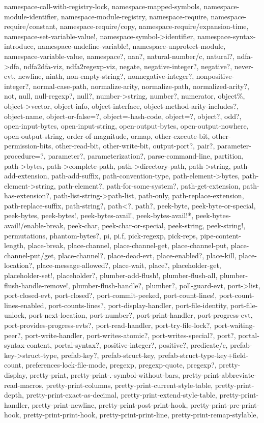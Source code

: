 {{namespace-call-with-registry-lock, namespace-mapped-symbols, namespace-module-identifier, namespace-module-registry, namespace-require, namespace-require/constant, namespace-require/copy, namespace-require/expansion-time, namespace-set-variable-value!, namespace-symbol->identifier, namespace-syntax-introduce, namespace-undefine-variable!, namespace-unprotect-module, namespace-variable-value, namespace?, nan?, natural-number/c, natural?, ndfa->dfa, ndfa2dfa-viz, ndfa2regexp-viz, negate, negative-integer?, negative?, never-evt, newline, ninth, non-empty-string?, nonnegative-integer?, nonpositive-integer?, normal-case-path, normalize-arity, normalize-path, normalized-arity?, not, null, null-regexp?, null?, number->string, number?, numerator, object\%, object->vector, object-info, object-interface, object-method-arity-includes?, object-name, object-or-false=?, object=-hash-code, object=?, object?, odd?, open-input-bytes, open-input-string, open-output-bytes, open-output-nowhere, open-output-string, order-of-magnitude, ormap, other-execute-bit, other-permission-bits, other-read-bit, other-write-bit, output-port?, pair?, parameter-procedure=?, parameter?, parameterization?, parse-command-line, partition, path->bytes, path->complete-path, path->directory-path, path->string, path-add-extension, path-add-suffix, path-convention-type, path-element->bytes, path-element->string, path-element?, path-for-some-system?, path-get-extension, path-has-extension?, path-list-string->path-list, path-only, path-replace-extension, path-replace-suffix, path-string?, path<?, path?, peek-byte, peek-byte-or-special, peek-bytes, peek-bytes!, peek-bytes-avail!, peek-bytes-avail!*, peek-bytes-avail!/enable-break, peek-char, peek-char-or-special, peek-string, peek-string!, permutations, phantom-bytes?, pi, pi.f, pick-regexp, pick-reps, pipe-content-length, place-break, place-channel, place-channel-get, place-channel-put, place-channel-put/get, place-channel?, place-dead-evt, place-enabled?, place-kill, place-location?, place-message-allowed?, place-wait, place?, placeholder-get, placeholder-set!, placeholder?, plumber-add-flush!, plumber-flush-all, plumber-flush-handle-remove!, plumber-flush-handle?, plumber?, poll-guard-evt, port->list, port-closed-evt, port-closed?, port-commit-peeked, port-count-lines!, port-count-lines-enabled, port-counts-lines?, port-display-handler, port-file-identity, port-file-unlock, port-next-location, port-number?, port-print-handler, port-progress-evt, port-provides-progress-evts?, port-read-handler, port-try-file-lock?, port-waiting-peer?, port-write-handler, port-writes-atomic?, port-writes-special?, port?, portal-syntax-content, portal-syntax?, positive-integer?, positive?, predicate/c, prefab-key->struct-type, prefab-key?, prefab-struct-key, prefab-struct-type-key+field-count, preferences-lock-file-mode, pregexp, pregexp-quote, pregexp?, pretty-display, pretty-print, pretty-print-.-symbol-without-bars, pretty-print-abbreviate-read-macros, pretty-print-columns, pretty-print-current-style-table, pretty-print-depth, pretty-print-exact-as-decimal, pretty-print-extend-style-table, pretty-print-handler, pretty-print-newline, pretty-print-post-print-hook, pretty-print-pre-print-hook, pretty-print-print-hook, pretty-print-print-line, pretty-print-remap-stylable, }}
